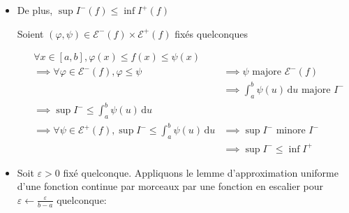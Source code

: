 \documentclass{article}
\begin{document}
\begin{question_kholle}
\begin{itemize}[label=$\lozenge$]
\begin{itemize}[label=$\star$]
			            \begin{align*}
				            \forall x \in [a, b], \varphi(x)\leqslant f(x) & \leqslant \|f\|_{\infty, [a, b]}                              \\
				            \implies \varphi                               & \leqslant \|f\|_{\infty[a, b]}                                \\
				            \implies \int_{a}^{b} \varphi(u) \, \mathrm du & \leqslant  \int_{a}^{b} \|f\|_{\infty, [a, b]}  \, \mathrm dt
			            \end{align*}
		      \end{itemize}

		      On procède de la même manière pour la borne inf de $I^{+}(f)$

		\item De plus, $\sup I^{-}(f) \leqslant \inf I^{+}(f)$

		      Soient $(\varphi, \psi) \in \mathcal{E}^{-}(f)\times \mathcal{E}^{+}(f)$ fixés quelconques


		      \begin{align*}
			       & \forall x \in [a, b], \varphi(x) \leqslant f(x) \leqslant \psi(x)                                                                                                           \\
			       & \implies \forall \varphi \in \mathcal{E}^{-}(f), \varphi \leqslant \psi                                & \implies \psi \text{ majore } \mathcal{E}^{-}(f)                   \\
			       &                                                                                                        & \implies \int_{a}^{b} \psi(u) \, \mathrm du  \text{ majore } I^{-} \\
			       & \implies \sup I^{-} \leqslant \int_{a}^{b} \psi(u) \, \mathrm du                                                                                                            \\
			       & \implies \forall \psi \in \mathcal{E}^{+}(f), \sup I^{-} \leqslant \int_{a}^{b} \psi(u)  \, \mathrm du & \implies \sup I^{-} \text{ minore } I^{-}                          \\
			       &                                                                                                        & \implies \sup I^{-} \leqslant \inf I^{+}
		      \end{align*}


		\item Soit $\varepsilon > 0$ fixé quelconque.
		      Appliquons le lemme d'approximation uniforme d'une fonction continue par morceaux par une fonction en escalier pour $\varepsilon \leftarrow \frac{\varepsilon}{b-a}$ quelconque:


\end{itemize}
\end{question_kholle}
\end{document}
